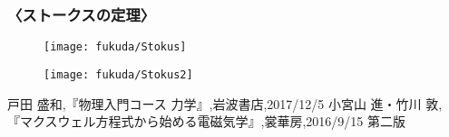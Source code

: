 \documentclass[10pt,b5paper,papersize,dvipdfmx]{jsbook}
\begin{document}
\subsubsection{〈ストークスの定理〉}
\begin{figure}[htbp]
  \begin{flushright}
  \texttt{[image: fukuda/Stokus]}
  \end{flushright}
\end{figure}
\begin{figure}[htbp]
  \begin{flushright}
  \texttt{[image: fukuda/Stokus2]}
  \end{flushright}
\end{figure}

\begin{thebibliography}{9}
 戸田 盛和,『物理入門コース 力学』,岩波書店,2017/12/5
 小宮山 進・竹川 敦,『マクスウェル方程式から始める電磁気学』,裳華房,2016/9/15 第二版

\end{thebibliography}

\end{document}
